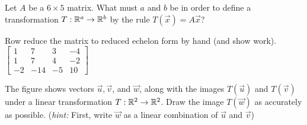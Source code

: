 \documentclass[11pt, letterpaper]{exam}
\begin{document}
\begin{questions}
\begin{q}{6}
	Let $A$ be a $6 \times 5$ matrix. What must $a$ and $b$ be in order to define a transformation $T: \mathbb{R}^a \rightarrow \mathbb{R}^b$ by the rule $T(\vec{x}) = A \vec{x}$?
\end{q}
\vspace{1in}

\begin{q}{10}
	Row reduce the matrix to reduced echelon form by hand (and show work).
	$\begin{bmatrix}
		1 & 7& 3& -4 \\
		1 & 7 & 4 & -2 \\
		-2 & -14 & -5 & 10
	\end{bmatrix}$
\end{q}
\vfill
\newpage

\begin{q}{10}
\end{q}
\vfill

\begin{q}{10}
\end{q}
\vfill \vfill

\begin{q}{8}
	The figure shows vectors $\vec{u}, \vec{v}$, and $\vec{w}$, along with the images $T(\vec{u})$ and $T(\vec{v})$ under a linear transformation $T:\mathbb{R}^2 \rightarrow \mathbb{R}^2$. Draw the image $T(\vec{w})$ as accurately as possible. (\emph{hint:} First, write $\vec{w}$ as a linear combination of $\vec{u}$ and $\vec{v}$)


\end{q}
\end{questions}
\end{document}
